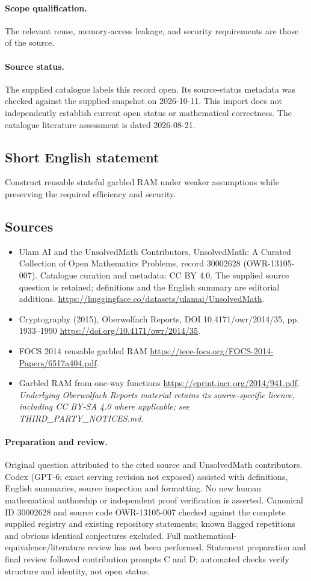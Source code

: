 \documentclass[11pt]{article}
\begin{document}
\paragraph{Scope qualification.}
The relevant reuse, memory-access leakage, and security requirements are those of the source.
\paragraph{Source status.}
The supplied catalogue labels this record open. Its source-status metadata was checked against the supplied snapshot on 2026-10-11. This import does not independently establish current open status or mathematical correctness. The catalogue literature assessment is dated 2026-08-21.
\subsection{Short English statement}
Construct reusable stateful garbled RAM under weaker assumptions while preserving the required efficiency and security.
\subsection{Sources}
\begin{itemize}
\item[S1] Ulam AI and the UnsolvedMath Contributors, UnsolvedMath: A Curated Collection of Open Mathematics Problems, record 30002628 (OWR-13105-007). Catalogue curation and metadata: CC BY 4.0. The supplied source question is retained; definitions and the English summary are editorial additions.
\url{https://huggingface.co/datasets/ulamai/UnsolvedMath}.
\item[S2] Cryptography (2015), Oberwolfach Reports, DOI 10.4171/owr/2014/35, pp. 1933--1990
\url{https://doi.org/10.4171/owr/2014/35}.
\item[S3] FOCS 2014 reusable garbled RAM
\url{https://ieee-focs.org/FOCS-2014-Papers/6517a404.pdf}.
\item[S4] Garbled RAM from one-way functions
\url{https://eprint.iacr.org/2014/941.pdf}.
\textit{Underlying Oberwolfach Reports material retains its source-specific licence, including CC BY-SA 4.0 where applicable; see THIRD\_PARTY\_NOTICES.md.}
\end{itemize}
\paragraph{Preparation and review.}
Original question attributed to the cited source and UnsolvedMath contributors. Codex (GPT-6; exact serving revision not exposed) assisted with definitions, English summaries, source inspection and formatting. No new human mathematical authorship or independent proof verification is asserted. Canonical ID 30002628 and source code OWR-13105-007 checked against the complete supplied registry and existing repository statements; known flagged repetitions and obvious identical conjectures excluded. Full mathematical-equivalence/literature review has not been performed. Statement preparation and final review followed contribution prompts C and D; automated checks verify structure and identity, not open status.
\label{end:30002628}
\end{document}
